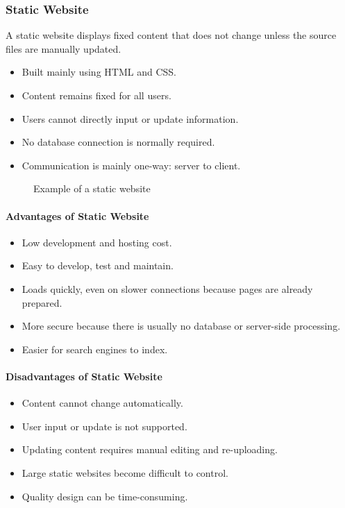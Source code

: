 \subsubsection{Static Website}

\begin{definitionbox}
A static website displays fixed content that does not change unless the source files are manually updated.
\end{definitionbox}

\begin{itemize}
    \item Built mainly using HTML and CSS.
    \item Content remains fixed for all users.
    \item Users cannot directly input or update information.
    \item No database connection is normally required.
    \item Communication is mainly one-way: server to client.
\end{itemize}

\begin{figure}[H]
    \centering
    \caption{Example of a static website}
    \label{fig:static-website}
\end{figure}

\paragraph{Advantages of Static Website}

\begin{itemize}
    \item Low development and hosting cost.
    \item Easy to develop, test and maintain.
    \item Loads quickly, even on slower connections because pages are already prepared.
    \item More secure because there is usually no database or server-side processing.
    \item Easier for search engines to index.
\end{itemize}

\paragraph{Disadvantages of Static Website}

\begin{itemize}
    \item Content cannot change automatically.
    \item User input or update is not supported.
    \item Updating content requires manual editing and re-uploading.
    \item Large static websites become difficult to control.
    \item Quality design can be time-consuming.
\end{itemize}


